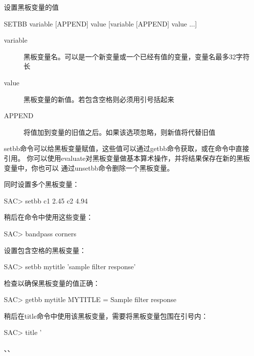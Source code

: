 \label{cmd:setbb}

设置黑板变量的值

\begin{SACSTX}
SETBB variable  [APPEND] value [variable [APPEND] value ...]
\end{SACSTX}

\begin{description}
\item [variable] 黑板变量名。可以是一个新变量或一个已经有值的变量，变量名最多32字符长
\item [value] 黑板变量的新值。若包含空格则必须用引号括起来
\item [APPEND] 将值加到变量的旧值之后。如果该选项忽略，则新值将代替旧值
\end{description}

setbb命令可以给黑板变量赋值，这些值可以通过getbb命令获取，或在命令中直接引用。
你可以使用evaluate对黑板变量做基本算术操作，并将结果保存在新的黑板变量中，你也可以
通过unsetbb命令删除一个黑板变量。

同时设置多个黑板变量：
\begin{SACCode}
SAC> setbb c1 2.45 c2 4.94
\end{SACCode}

稍后在命令中使用这些变量：
\begin{SACCode}
SAC> bandpass corners %
\end{SACCode}

设置包含空格的黑板变量：
\begin{SACCode}
SAC> setbb mytitle 'sample filter response'
\end{SACCode}

检查以确保黑板变量的值正确：
\begin{SACCode}
SAC> getbb mytitle
 MYTITLE = Sample filter response
\end{SACCode}

稍后在title命令中使用该黑板变量，需要将黑板变量包围在引号内：
\begin{SACCode}
SAC> title '%
\end{SACCode}

、、
